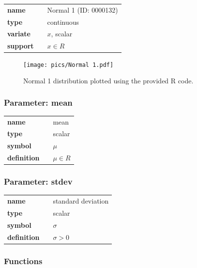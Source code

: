 \documentclass{article}
\begin{document}
  \bigskip 

\begin{tabular}{p{2cm}cl}
\textbf{name} & & Normal 1 (ID: 0000132)\\ 
 
\textbf{type} & & continuous \\ 

\textbf{variate} & & $x$, scalar \\ 

\textbf{support} & & $x \in R$
\end{tabular}

\begin{figure}[ht!]
\centering
  \texttt{[image: pics/Normal 1.pdf]}
 \caption{Normal 1 distribution plotted using the provided R code.}
 \label{fig:Normal 1}
\end{figure}

\subsubsection*{Parameter: mean}

\noindent\begin{tabular}{p{2cm}cl}
\textbf{name} & & mean \\
\textbf{type} & & scalar \\
\textbf{symbol} & & $\mu$  \\
\textbf{definition} & & $\mu \in R$
\end{tabular}
\subsubsection*{Parameter: stdev}

\noindent\begin{tabular}{p{2cm}cl}
\textbf{name} & & standard deviation \\
\textbf{type} & & scalar \\
\textbf{symbol} & & $\sigma$  \\
\textbf{definition} & & $\sigma> 0$
\end{tabular}
\subsubsection*{Functions}
\end{document}
